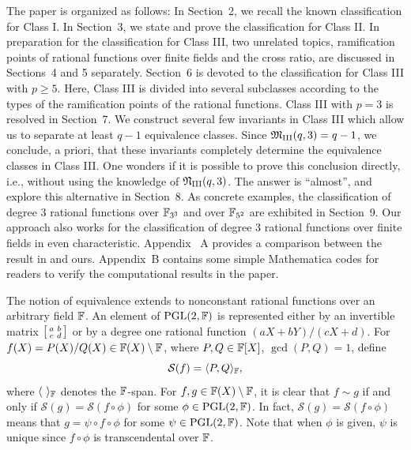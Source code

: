 \documentclass{amsart}
\numberwithin{equation}{section}
\theoremstyle{definition}
\newcommand{\f}{\Bbb F}
\newcommand{\pgl}{\mathrm{PGL}}
\begin{document}
The paper is organized as follows: In Section~2, we recall the known classification for Class I. In Section~3, we state and prove the classification for Class II. In preparation for the classification for Class III, two unrelated topics, ramification points of rational functions over finite fields and the cross ratio, are discussed in Sections~4 and 5 separately. Section~6 is devoted to the classification for Class III with $p\ge 5$. Here, Class III is divided into several subclasses according to the types of the ramification points of the rational functions. Class III with $p=3$ is resolved in Section~7. We construct several few invariants in Class III which allow us to separate at least $q-1$ equivalence classes. Since $\frak M_{\text{III}}(q,3)=q-1$, we conclude, a priori, that these invariants completely determine the equivalence classes in Class III. One wonders if it is possible to prove this conclusion directly, i.e., without using the knowledge of $\frak N_{\text{III}}(q,3)$. The answer is ``almost'', and explore this alternative in Section~8. As concrete examples, the classification of degree 3 rational functions over $\f_{3^3}$ and over $\f_{5^2}$ are exhibited in Section~9. Our approach also works for the classification of degree 3 rational functions over finite fields in even characteristic. Appendix ~A provides a comparison between the result in \cite{Mattarei-Pizzato-JAA-2024} and ours. Appendix~B contains some simple Mathematica codes for readers to verify the computational results in the paper.

The notion of equivalence extends to nonconstant rational functions over an arbitrary field $\f$. An element of $\pgl(2,\f)$ is represented either by an invertible matrix $\left[\begin{smallmatrix}a&b\cr c&d\end{smallmatrix}\right]$ or by a degree one rational function $(aX+bY)/(cX+d)$. For $f(X)=P(X)/Q(X)\in\f(X)\setminus\f$, where $P,Q\in\f[X]$, $\gcd(P,Q)=1$, define
\[
\mathcal S(f)=\langle P,Q\rangle_{\f},
\]
where $\langle \ \rangle_{\f}$ denotes the $\f$-span. For $f,g\in\f(X)\setminus\f$, it is clear that $f\sim g$ if and only if $\mathcal S(g)=\mathcal S(f\circ \phi)$ for some $\phi\in\pgl(2,\f)$. In fact, $\mathcal S(g)=\mathcal S(f\circ \phi)$ means that $g=\psi\circ f\circ \phi$ for some $\psi\in\pgl(2,\f)$. Note that when $\phi$ is given, $\psi$ is unique since $f\circ\phi$ is transcendental over $\f$. 



\end{document}
